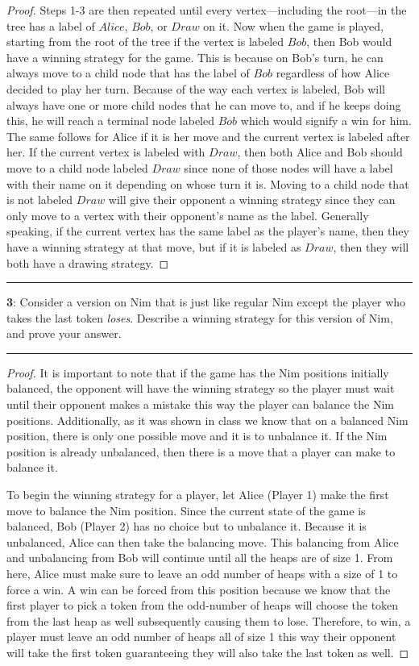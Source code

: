 \documentclass[11pt]{article}
\newcommand\question[2]{\vspace{.25in}\hrule\textbf{#1}: #2\vspace{.5em}\hrule\vspace{.10in}}
\begin{document}
\begin{proof}
	Steps 1-3 are then repeated until every vertex—including the root—in the tree has a label of $Alice$, $Bob$, or $Draw$ on it. Now when the game is played, starting from the root of the tree if the vertex is labeled $Bob$, then Bob would have a winning strategy for the game. This is because on Bob's turn, he can always move to a child node that has the label of $Bob$ regardless of how Alice decided to play her turn. Because of the way each vertex is labeled, Bob will always have one or more child nodes that he can move to, and if he keeps doing this, he will reach a terminal node labeled $Bob$ which would signify a win for him. The same follows for Alice if it is her move and the current vertex is labeled after her. If the current vertex is labeled with $Draw$, then both Alice and Bob should move to a child node labeled $Draw$ since none of those nodes will have a label with their name on it depending on whose turn it is. Moving to a child node that is not labeled $Draw$ will give their opponent a winning strategy since they can only move to a vertex with their opponent's name as the label. Generally speaking, if the current vertex has the same label as the player's name, then they have a winning strategy at that move, but if it is labeled as $Draw$, then they will both have a drawing strategy.
\end{proof}

\question{3}{Consider a version on Nim that is just like regular Nim except the player who takes the last token \textit{loses}. Describe a winning strategy for this version of Nim, and prove your answer.}
\begin{proof}
	It is important to note that if the game has the Nim positions initially balanced, the opponent will have the winning strategy so the player must wait until their opponent makes a mistake this way the player can balance the Nim positions. Additionally, as it was shown in class we know that on a balanced Nim position, there is only one possible move and it is to unbalance it. If the Nim position is already unbalanced, then there is a move that a player can make to balance it.

	To begin the winning strategy for a player, let Alice (Player 1) make the first move to balance the Nim position. Since the current state of the game is balanced, Bob (Player 2) has no choice but to unbalance it. Because it is unbalanced, Alice can then take the balancing move. This balancing from Alice and unbalancing from Bob will continue until all the heaps are of size 1. From here, Alice must make sure to leave an odd number of heaps with a size of 1 to force a win. A win can be forced from this position because we know that the first player to pick a token from the odd-number of heaps will choose the token from the last heap as well subsequently causing them to lose. Therefore, to win, a player must leave an odd number of heaps all of size 1 this way their opponent will take the first token guaranteeing they will also take the last token as well.
\end{proof}





	
\end{document}
